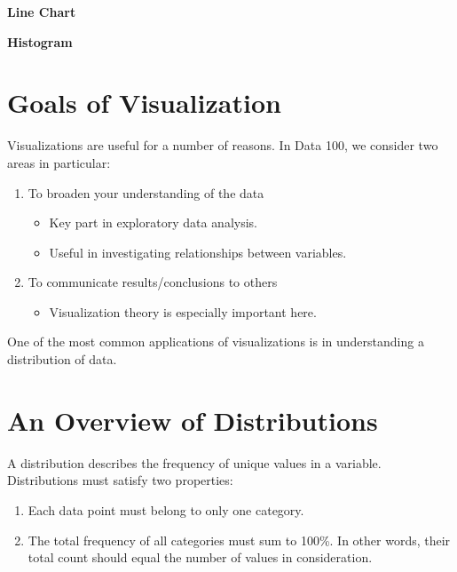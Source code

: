 \documentclass[
  letterpaper,
  DIV=11,
  numbers=noendperiod]{scrreprt}
\providecommand{\tightlist}{%
  \setlength{\itemsep}{0pt}\setlength{\parskip}{0pt}}\usepackage{longtable,booktabs,array}
\begin{document}
\textbf{Line Chart}

\textbf{Histogram}

\hypertarget{goals-of-visualization}{%
\section{Goals of Visualization}\label{goals-of-visualization}}

Visualizations are useful for a number of reasons. In Data 100, we
consider two areas in particular:

\begin{enumerate}
\def\labelenumi{\arabic{enumi}.}
\tightlist
\item
  To broaden your understanding of the data

  \begin{itemize}
  \tightlist
  \item
    Key part in exploratory data analysis.
  \item
    Useful in investigating relationships between variables.
  \end{itemize}
\item
  To communicate results/conclusions to others

  \begin{itemize}
  \tightlist
  \item
    Visualization theory is especially important here.
  \end{itemize}
\end{enumerate}

One of the most common applications of visualizations is in
understanding a distribution of data.

\hypertarget{an-overview-of-distributions}{%
\section{An Overview of
Distributions}\label{an-overview-of-distributions}}

A distribution describes the frequency of unique values in a variable.
Distributions must satisfy two properties:

\begin{enumerate}
\def\labelenumi{\arabic{enumi}.}
\tightlist
\item
  Each data point must belong to only one category.
\item
  The total frequency of all categories must sum to 100\%. In other
  words, their total count should equal the number of values in
  consideration.
\end{enumerate}
\end{document}
